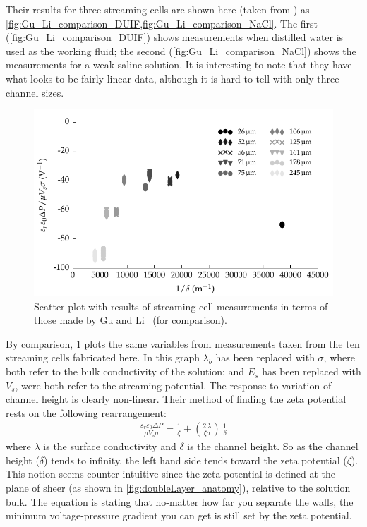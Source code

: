   Their results for three streaming cells are shown here (taken from \cite{Gu2000}) as \cref{fig:Gu_Li_comparison_DUIF,fig:Gu_Li_comparison_NaCl}.
  The first (\cref{fig:Gu_Li_comparison_DUIF}) shows measurements when distilled water is used as the working fluid; the second (\cref{fig:Gu_Li_comparison_NaCl}) shows the measurements for a weak saline solution.
  It is interesting to note that they have what looks to be fairly linear data, although it is hard to tell with only three channel sizes.

  \begin{figure}
      \centering
      \includegraphics{content/pt1/01-PowerHarvesting/graphics/graph_streamingComparison_gu}
      \caption{\label{fig:streamingCell_scatter_Gu_Li}Scatter plot with results of streaming cell measurements in terms of those made by Gu and Li~\cite{Gu2000} (for comparison).}
  \end{figure}

  By comparison, \cref{fig:streamingCell_scatter_Gu_Li} plots the same variables from measurements taken from the ten streaming cells fabricated here.
  In this graph $\lambda_{b}$ has been replaced with $\sigma$, where both refer to the bulk conductivity of the solution; and $E_{s}$ has been replaced with $V_{s}$, were both refer to the streaming potential.
  The response to variation of channel height is clearly non-linear.
  Their method of finding the zeta potential rests on the following rearrangement:
  \begin{eqnarray}
      \frac{\varepsilon_{r}\varepsilon_{0}\Delta P}{\mu V_{s}\sigma} = \frac{1}{\zeta} + \left( \frac{2\,\lambda}{\zeta \sigma}\right)\,\frac{1}{\delta}
  \end{eqnarray}
  where $\lambda$ is the surface conductivity and $\delta$ is the channel height.
  So as the channel height ($\delta$) tends to infinity, the left hand side tends toward the zeta potential ($\zeta$).
  This notion seems counter intuitive since the zeta potential is defined at the plane of sheer (as shown in \cref{fig:doubleLayer_anatomy}), relative to the solution bulk.
  The equation is stating that no-matter how far you separate the walls, the minimum voltage-pressure gradient you can get is still set by the zeta potential.

